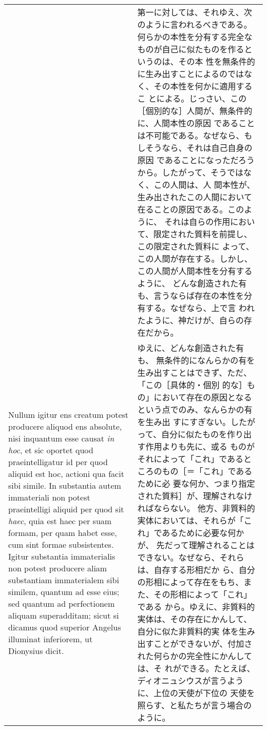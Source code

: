 \documentclass[10pt]{jsarticle} %
\begin{document}
\begin{longtable}{p{21em}p{21em}}
&

第一に対しては、それゆえ、次のように言われるべきである。
何らかの本性を分有する完全なものが自己に似たものを作るというのは、その本
 性を無条件的に生み出すことによるのではなく、その本性を何かに適用するこ
 とによる。じっさい、この［個別的な］人間が、無条件的に、人間本性の原因
 であることは不可能である。なぜなら、もしそうなら、それは自己自身の原因
 であることになっただろうから。したがって、そうではなく、この人間は、人
 間本性が、生み出されたこの人間において在ることの原因である。このように、
 それは自らの作用において、限定された質料を前提し、この限定された質料に
 よって、この人間が存在する。しかし、この人間が人間本性を分有するように、
 どんな創造された有も、言うならば存在の本性を分有する。なぜなら、上で言
 われたように、神だけが、自らの存在だから。

\\

Nullum igitur ens creatum potest producere aliquod ens absolute, nisi
 inquantum esse causat {\itshape in hoc}, et sic oportet quod
 praeintelligatur id per quod aliquid est hoc, actioni qua facit sibi
 simile.  In substantia autem immateriali non potest praeintelligi
 aliquid per quod sit {\itshape haec}, quia est haec per suam formam, per quam
 habet esse, cum sint formae subsistentes. Igitur substantia
 immaterialis non potest producere aliam substantiam immaterialem sibi
 similem, quantum ad esse eius; sed quantum ad perfectionem aliquam
 superadditam; sicut si dicamus quod superior Angelus illuminat
 inferiorem, ut Dionysius dicit.

&

ゆえに、どんな創造された有も、
 無条件的になんらかの有を生み出すことはできず、ただ、「この［具体的・個別
 的な］もの」において存在の原因となるという点でのみ、なんらかの有を生み出
 すにすぎない。したがって、自分に似たものを作り出す作用よりも先に、或る
 ものがそれによって「これ」であるところのもの［＝「これ」であるために必
 要な何か、つまり指定された質料］が、理解されなければならない。
他方、非質料的実体においては、それらが「これ」であるために必要な何かが、
 先だって理解されることはできない。なぜなら、それらは、自存する形相だか
 ら、自分の形相によって存在をもち、また、その形相によって「これ」である
 から。ゆえに、非質料的実体は、その存在にかんして、自分に似た非質料的実
 体を生み出すことができないが、付加された何らかの完全性にかんしては、そ
 れができる。たとえば、ディオニュシウスが言うように、上位の天使が下位の
 天使を照らす、と私たちが言う場合のように。

\\



\end{longtable}
\end{document}
